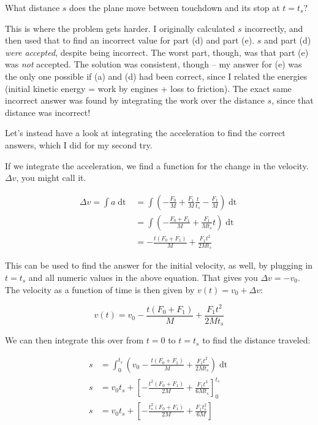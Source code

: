 \documentclass[8.01x]{subfiles}
\begin{document}
What distance $s$ does the plane move between touchdown and its stop at $t = t_s$?

This is where the problem gets harder. I originally calculated $s$ incorrectly, and then used that to find an incorrect value for part (d) and part (e). $s$ and part (d) \emph{were accepted}, despite being incorrect. The worst part, though, was that part (e) was \emph{not} accepted. The solution was consistent, though -- my answer for (e) was the only one possible if (a) and (d) had been correct, since I related the energies (initial kinetic energy = work by engines + loss to friction). The exact same incorrect answer was found by integrating the work over the distance $s$, since that distance was incorrect!

Let's instead have a look at integrating the acceleration to find the correct answers, which I did for my second try.

If we integrate the acceleration, we find a function for the change in the velocity. $\Delta v$, you might call it.

\begin{align}
\Delta v = \int a \mathop{dt} &= \int \left(-\frac{F_0}{M} + \frac{F_1}{M} \frac{t}{t_s} - \frac{F_1}{M} \right) \mathop{dt}\\
                              &= \int \left(-\frac{F_0 + F_1}{M} + \frac{F_1}{M t_s} t \right) \mathop{dt}\\
                              &= -\frac{t(F_0 + F_1)}{M} + \frac{F_1 t^2}{2 M t_s}
\end{align}

This can be used to find the answer for the initial velocity, as well, by plugging in $t = t_s$ and all numeric values in the above equation. That gives you $\Delta v = -v_0$. The velocity as a function of time is then given by $v(t) = v_0 + \Delta v$:

\begin{equation}
v(t) = v_0 - \frac{t(F_0 + F_1)}{M} + \frac{F_1 t^2}{2 M t_s}
\end{equation}

We can then integrate this over from $t = 0$ to $t = t_s$ to find the distance traveled:

\begin{align}
s &= \int_0^{t_s} \left( v_0 - \frac{t(F_0 + F_1)}{M} + \frac{F_1 t^2}{2 M t_s} \right) \mathop{dt}\\
s &= v_0 t_s + \left[ - \frac{t^2(F_0 + F_1)}{2M} + \frac{F_1 t^3}{6 M t_s} \right]_0^{t_s}\\
s &= v_0 t_s + \left[ - \frac{t_s^2(F_0 + F_1)}{2M} + \frac{F_1 t_s^2}{6 M} \right]
\end{align}
\end{document}
